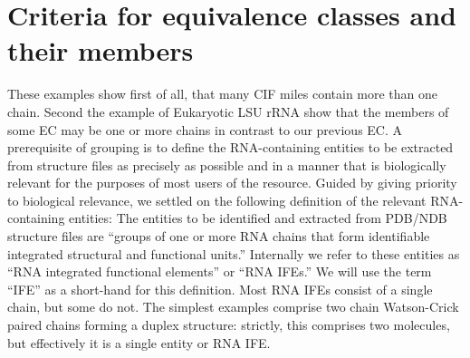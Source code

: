\section{Criteria for equivalence classes and their members}

These examples show first of all, that many CIF miles contain more than one
chain. Second the example of Eukaryotic LSU rRNA show that the members of some
EC may be one or more chains in contrast to our previous EC. A prerequisite of
grouping is to define the RNA-containing entities to be extracted from structure
files as precisely as possible and in a manner that is biologically relevant for
the purposes of most users of the resource. Guided by giving priority to
biological relevance, we settled on the following definition of the relevant
RNA-containing entities: The entities to be identified and extracted from
PDB/NDB structure files are “groups of one or more RNA chains that form
identifiable integrated structural and functional units.” Internally we refer to
these entities as “RNA integrated functional elements” or “RNA IFEs.” We will
use the term “IFE” as a short-hand for this definition.  Most RNA IFEs consist
of a single chain, but some do not. The simplest examples comprise two chain
Watson-Crick paired chains forming a duplex structure: strictly, this comprises
two molecules, but effectively it is a single entity or RNA IFE.

